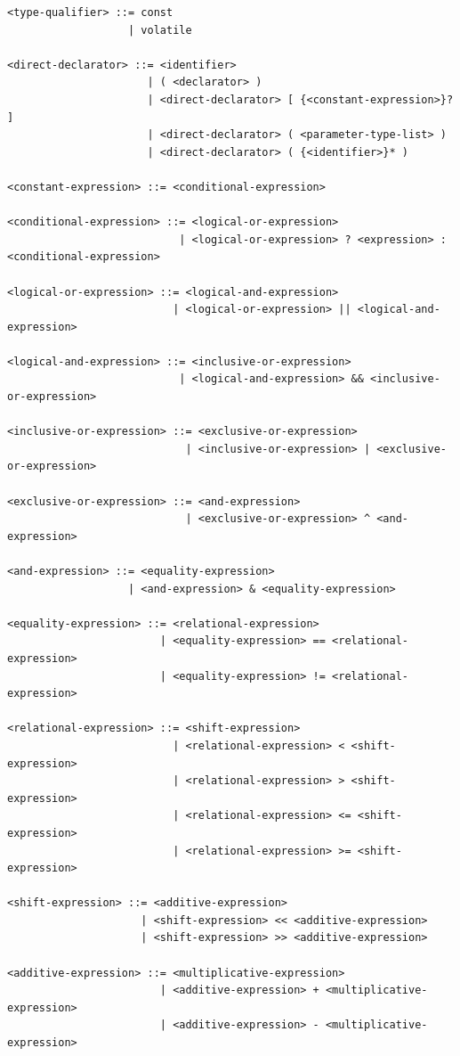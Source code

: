 \documentclass[
	12pt, %
]{fphw}
\begin{document}
\begin{verbatim}
<type-qualifier> ::= const
                   | volatile

<direct-declarator> ::= <identifier>
                      | ( <declarator> )
                      | <direct-declarator> [ {<constant-expression>}? ]
                      | <direct-declarator> ( <parameter-type-list> )
                      | <direct-declarator> ( {<identifier>}* )

<constant-expression> ::= <conditional-expression>

<conditional-expression> ::= <logical-or-expression>
                           | <logical-or-expression> ? <expression> : <conditional-expression>

<logical-or-expression> ::= <logical-and-expression>
                          | <logical-or-expression> || <logical-and-expression>

<logical-and-expression> ::= <inclusive-or-expression>
                           | <logical-and-expression> && <inclusive-or-expression>

<inclusive-or-expression> ::= <exclusive-or-expression>
                            | <inclusive-or-expression> | <exclusive-or-expression>

<exclusive-or-expression> ::= <and-expression>
                            | <exclusive-or-expression> ^ <and-expression>

<and-expression> ::= <equality-expression>
                   | <and-expression> & <equality-expression>

<equality-expression> ::= <relational-expression>
                        | <equality-expression> == <relational-expression>
                        | <equality-expression> != <relational-expression>

<relational-expression> ::= <shift-expression>
                          | <relational-expression> < <shift-expression>
                          | <relational-expression> > <shift-expression>
                          | <relational-expression> <= <shift-expression>
                          | <relational-expression> >= <shift-expression>

<shift-expression> ::= <additive-expression>
                     | <shift-expression> << <additive-expression>
                     | <shift-expression> >> <additive-expression>

<additive-expression> ::= <multiplicative-expression>
                        | <additive-expression> + <multiplicative-expression>
                        | <additive-expression> - <multiplicative-expression>


\end{verbatim}
\end{document}
